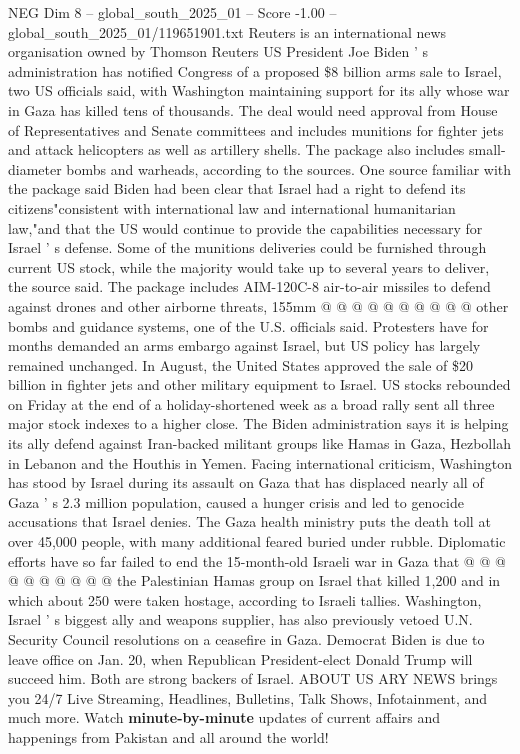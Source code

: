 \begin{textsample}{NEG Dim 8 – global\_south\_2025\_01 – Score -1.00 – global\_south\_2025\_01/119651901.txt}  \label{ex:f8_neg_329}
Reuters is an international news organisation owned by Thomson Reuters US President Joe Biden ' s administration has notified Congress of a proposed \$8 billion arms sale to Israel, two US officials said, with Washington maintaining support for its ally whose war in Gaza has killed tens of thousands.
The deal would need approval from House of Representatives and Senate committees and includes munitions for fighter jets and attack helicopters as well as artillery shells.
The package also includes small-diameter bombs and warheads, according to the sources.
One source familiar with the package said Biden had been clear that Israel had a right to defend its citizens"consistent with international law and international humanitarian law,"and that the US would continue to provide the capabilities necessary for Israel ' s defense.
Some of the munitions deliveries could be furnished through current US stock, while the majority would take up to several years to deliver, the source said.
The package includes AIM-120C-8 air-to-air missiles to defend against drones and other airborne threats, 155mm @ @ @ @ @ @ @ @ @ @ other bombs and guidance systems, one of the U.S. officials said.
Protesters have for months demanded an arms embargo against Israel, but US policy has largely remained unchanged.
In August, the United States approved the sale of \$20 billion in fighter jets and other military equipment to Israel.
US stocks rebounded on Friday at the end of a holiday-shortened week as a broad rally sent all three major stock indexes to a higher close.
The Biden administration says it is helping its ally defend against Iran-backed militant groups like Hamas in Gaza, Hezbollah in Lebanon and the Houthis in Yemen.
Facing international criticism, Washington has stood by Israel during its assault on Gaza that has displaced nearly all of Gaza ' s 2.3 million population, caused a hunger crisis and led to genocide accusations that Israel denies.
The Gaza health ministry puts the death toll at over 45,000 people, with many additional feared buried under rubble.
Diplomatic efforts have so far failed to end the 15-month-old Israeli war in Gaza that @ @ @ @ @ @ @ @ @ @ the Palestinian Hamas group on Israel that killed 1,200 and in which about 250 were taken hostage, according to Israeli tallies.
Washington, Israel ' s biggest ally and weapons supplier, has also previously vetoed U.N.
Security Council resolutions on a ceasefire in Gaza.
Democrat Biden is due to leave office on Jan. 20, when Republican President-elect Donald Trump will succeed him.
Both are strong backers of Israel.
ABOUT US ARY NEWS brings you 24/7 Live Streaming, Headlines, Bulletins, Talk Shows, Infotainment, and much more.
Watch \textbf{minute-by-minute} updates of current affairs and happenings from Pakistan and all around the world!

\end{textsample}
